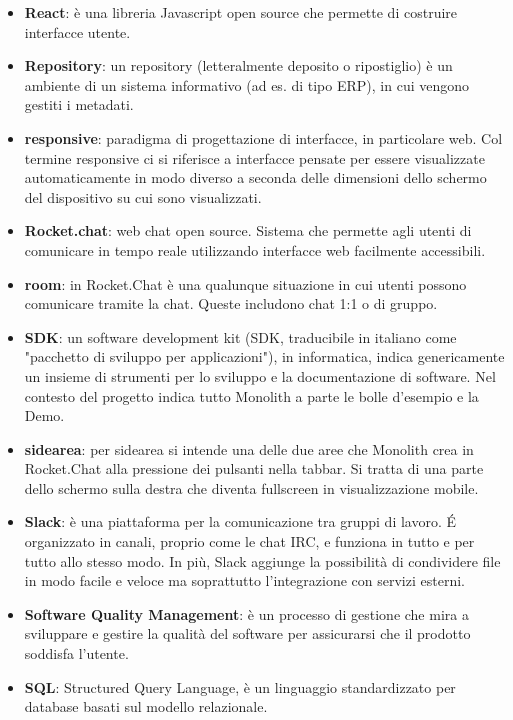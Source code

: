 \begin{itemize}
\item[] \textbf{React}: è una libreria Javascript open source che permette di costruire interfacce utente.
\item[] \textbf{Repository}: un repository (letteralmente deposito o ripostiglio) è un ambiente di un sistema informativo (ad es. di tipo ERP), in cui vengono gestiti i metadati.
\item[] \textbf{responsive}: paradigma di progettazione di interfacce, in particolare web. Col termine responsive ci si riferisce a interfacce pensate per essere visualizzate automaticamente in modo diverso a seconda delle dimensioni dello schermo del dispositivo su cui sono visualizzati.
\item[] \textbf{Rocket.chat}: web chat open source. Sistema che permette agli utenti di comunicare in tempo reale utilizzando interfacce web facilmente accessibili.
\item[] \textbf{room}: in Rocket.Chat è una qualunque situazione in cui utenti possono comunicare tramite la chat. Queste includono chat 1:1 o di gruppo.
\end{itemize}
\newpage

\begin{itemize}
\item[] \textbf{SDK}: un software development kit (SDK, traducibile in italiano come "pacchetto di sviluppo per applicazioni"), in informatica, indica genericamente un insieme di strumenti per lo sviluppo e la documentazione di software. Nel contesto del progetto indica tutto Monolith a parte le bolle d'esempio e la Demo.
\item[] \textbf{sidearea}: per sidearea si intende una delle due aree che Monolith crea in Rocket.Chat alla pressione dei pulsanti nella tabbar. Si tratta di una parte dello schermo sulla destra che diventa fullscreen in visualizzazione mobile.
\item[] \textbf{Slack}: è una piattaforma per la comunicazione tra gruppi di lavoro. \'E organizzato in canali, proprio come le chat IRC, e funziona in tutto e per tutto allo stesso modo. In più, Slack aggiunge la possibilità di condividere file in modo facile e veloce ma soprattutto l'integrazione con servizi esterni.
\item[] \textbf{Software Quality Management}: è un processo di gestione che mira a sviluppare e gestire la qualità del software per assicurarsi che il prodotto soddisfa l'utente.
\item[] \textbf{SQL}: Structured Query Language, è un linguaggio standardizzato per database basati sul modello relazionale.
\end{itemize}
\newpage

